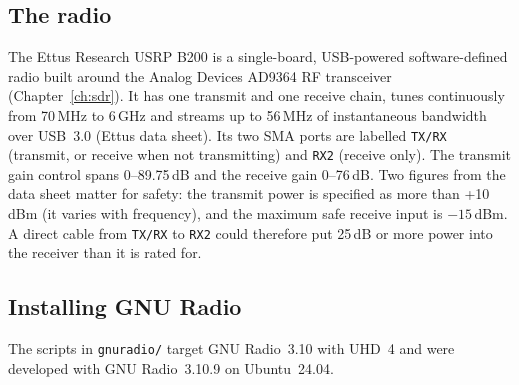 \subsection{The radio}

The Ettus Research USRP B200 is a single-board, USB-powered software-defined radio built around the
Analog Devices AD9364 RF transceiver (Chapter~\ref{ch:sdr}). It has one transmit and one receive
chain, tunes continuously from 70\,MHz to 6\,GHz and streams up to 56\,MHz of instantaneous
bandwidth over USB~3.0 (Ettus data sheet). Its two SMA ports are labelled \texttt{TX/RX} (transmit, or
receive when not transmitting) and \texttt{RX2} (receive only). The transmit gain control spans
0--89.75\,dB and the receive gain 0--76\,dB. Two figures from the data sheet matter for safety: the
transmit power is specified as more than +10\,dBm (it varies with frequency), and the maximum safe
receive input is $-15$\,dBm. A direct cable from \texttt{TX/RX} to \texttt{RX2} could therefore put
25\,dB or more power into the receiver than it is rated for.

\subsection{Installing GNU Radio}

The scripts in \texttt{gnuradio/} target GNU Radio~3.10 with UHD~4 and were developed with
GNU Radio~3.10.9 on Ubuntu~24.04.

